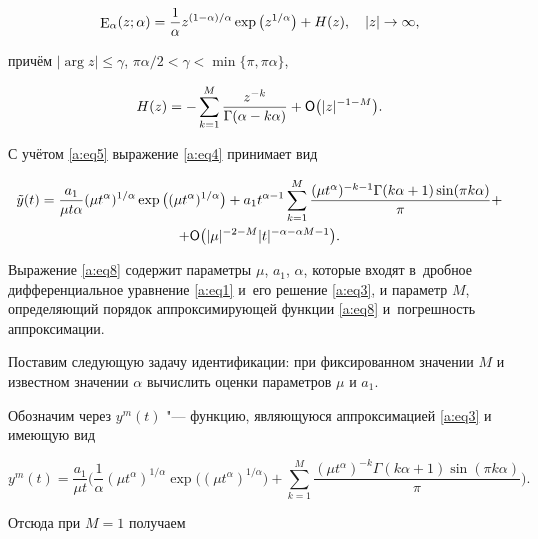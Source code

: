 \begin{equation}

\label{a:eq5}

\mathop{\rm E}\nolimits_{\alpha}(z;\alpha)=\frac{1}{\alpha}z^{(1-\alpha)/{\alpha}}\exp \big(z^{{1}/{\alpha}}\big) + H(z), \quad |z| \to \infty,

\end{equation}

причём $| \arg z|\leq \gamma$, ${\pi \alpha}/{2}<\gamma< \min \{\pi, \pi \alpha\}$, 

$$H(z)=-\sum_{k=1}^{M} \dfrac{{z}^{-k}}{\Gamma(\alpha-k\alpha)}+{\sf O}\bigl(|z|^{-1-M}\bigr).$$

С учётом \eqref{a:eq5} выражение \eqref{a:eq4} принимает вид

\begin{multline}\label{a:eq8}

\tilde{y}(t)=\frac{a_1}{\mu t\alpha}(\mu t^{\alpha})^{{1}/{\alpha}} \exp \big((\mu t^{\alpha})^{{1}/{\alpha}} \big)

+a_1 t^{\alpha-1}\sum \limits_{k=1}^{M} \dfrac{(\mu t^{\alpha})^{-k-1}\Gamma(k\alpha+1) \sin(\pi k \alpha)}{\pi}+ 

\\+ 

{\sf O}\bigl({|\mu|^{-2-M} |t|^{-\alpha-\alpha M-1}}\bigr). 

\end{multline}

Выражение \eqref{a:eq8} содержит параметры $\mu$, $a_1$, $\alpha$, которые входят в~дробное дифференциальное уравнение \eqref{a:eq1} и~его решение \eqref{a:eq3}, и параметр $M$, определяющий порядок аппроксимирующей функции \eqref{a:eq8} и~погрешность аппроксимации.



Поставим следующую задачу идентификации: при фиксированном значении $M$ и известном значении $\alpha$ вычислить оценки параметров $\mu$ и $a_1$. 

Обозначим через $y^m (t)$ "--- функцию, являющуюся аппроксимацией \eqref{a:eq3} и имеющую вид 

$$

y^m(t)=\dfrac{a_1}{\mu t}\bigg(\frac{1}{\alpha}(\mu t^{\alpha})^{{1}/{\alpha}}\exp \big((\mu t^{\alpha})^{{1}/{\alpha}} \big)+\sum \limits_{k=1}^{M} \frac{(\mu t^{\alpha})^{-k}\Gamma(k\alpha+1) \sin(\pi k \alpha)}{\pi}\bigg).

$$

Отсюда при $M=1$ получаем

